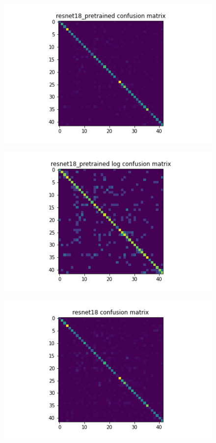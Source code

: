 \begin{figure}[t]
  \begin{minipage}[b]{.5\linewidth}
    \centering
    {\includegraphics[width=1.2\textwidth]{figs/conf_matrix/resnet18_pretrained_conf.png}}
  \end{minipage}
  \hfill
  \begin{minipage}[b]{.5\linewidth}
    \centering
    {\includegraphics[width=1.2\textwidth]{figs/conf_matrix/resnet18_pretrained_log_conf.png}}
  \end{minipage}
  \vfill
  \begin{minipage}[b]{.5\linewidth}
    \centering
    {\includegraphics[width=1.2\textwidth]{figs/conf_matrix/resnet18_conf.png}}

\end{minipage}
\end{figure}
